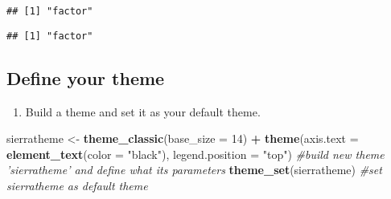 \documentclass[
]{article}
\newenvironment{Shaded}{\begin{snugshade}}{\end{snugshade}}
\newcommand{\CommentTok}[1]{\textcolor[rgb]{0.56,0.35,0.01}{\textit{#1}}}
\newcommand{\DataTypeTok}[1]{\textcolor[rgb]{0.13,0.29,0.53}{#1}}
\newcommand{\DecValTok}[1]{\textcolor[rgb]{0.00,0.00,0.81}{#1}}
\newcommand{\KeywordTok}[1]{\textcolor[rgb]{0.13,0.29,0.53}{\textbf{#1}}}
\newcommand{\NormalTok}[1]{#1}
\newcommand{\OperatorTok}[1]{\textcolor[rgb]{0.81,0.36,0.00}{\textbf{#1}}}
\newcommand{\StringTok}[1]{\textcolor[rgb]{0.31,0.60,0.02}{#1}}
\providecommand{\tightlist}{%
  \setlength{\itemsep}{0pt}\setlength{\parskip}{0pt}}
\begin{document}
\begin{verbatim}
## [1] "factor"
\end{verbatim}

\begin{Shaded}
\end{Shaded}

\begin{verbatim}
## [1] "factor"
\end{verbatim}

\begin{Shaded}
\end{Shaded}

\hypertarget{define-your-theme}{%
\subsection{Define your theme}\label{define-your-theme}}

\begin{enumerate}
\def\labelenumi{\arabic{enumi}.}
\setcounter{enumi}{2}
\tightlist
\item
  Build a theme and set it as your default theme.
\end{enumerate}

\begin{Shaded}
\begin{Highlighting}[]
\NormalTok{sierratheme <-}\StringTok{ }\KeywordTok{theme_classic}\NormalTok{(}\DataTypeTok{base_size =} \DecValTok{14}\NormalTok{) }\OperatorTok{+}
\StringTok{  }\KeywordTok{theme}\NormalTok{(}\DataTypeTok{axis.text =} \KeywordTok{element_text}\NormalTok{(}\DataTypeTok{color =} \StringTok{"black"}\NormalTok{), }
        \DataTypeTok{legend.position =} \StringTok{"top"}\NormalTok{)}
\CommentTok{#build new theme 'sierratheme' and define what its parameters}
\KeywordTok{theme_set}\NormalTok{(sierratheme) }\CommentTok{#set sierratheme as default theme}
\end{Highlighting}
\end{Shaded}
\end{document}
